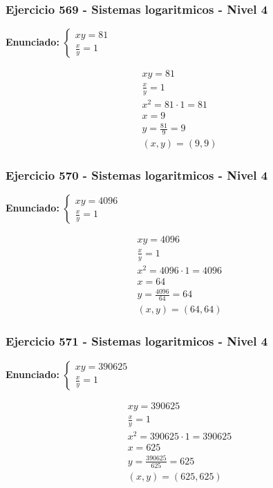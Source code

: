\documentclass[12pt,a4paper]{article}
\begin{document}
\subsubsection*{Ejercicio 569 - Sistemas logaritmicos - Nivel 4}
\textbf{Enunciado:} \(\begin{cases} xy=81\\ \frac{x}{y}=1\end{cases}\)

\[
\begin{aligned}
xy=81\\
\frac{x}{y}=1\\
x^2=81\cdot 1=81\\
x=9\\
y=\frac{81}{9}=9\\
\boxed{(x,y)=(9,9)}
\end{aligned}
\]


\subsubsection*{Ejercicio 570 - Sistemas logaritmicos - Nivel 4}
\textbf{Enunciado:} \(\begin{cases} xy=4096\\ \frac{x}{y}=1\end{cases}\)

\[
\begin{aligned}
xy=4096\\
\frac{x}{y}=1\\
x^2=4096\cdot 1=4096\\
x=64\\
y=\frac{4096}{64}=64\\
\boxed{(x,y)=(64,64)}
\end{aligned}
\]


\subsubsection*{Ejercicio 571 - Sistemas logaritmicos - Nivel 4}
\textbf{Enunciado:} \(\begin{cases} xy=390625\\ \frac{x}{y}=1\end{cases}\)

\[
\begin{aligned}
xy=390625\\
\frac{x}{y}=1\\
x^2=390625\cdot 1=390625\\
x=625\\
y=\frac{390625}{625}=625\\
\boxed{(x,y)=(625,625)}
\end{aligned}
\]
\end{document}
